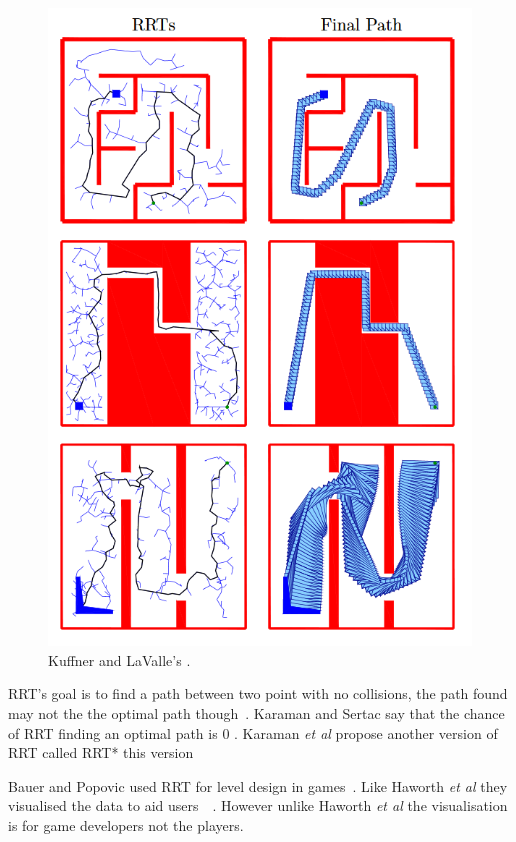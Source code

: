 \documentclass[journal]{IEEEtran}
\begin{document}
\begin{figure}[h]
	\includegraphics[width=1.0\linewidth]{KuffnerRRT.png}
	\caption{ Kuffner and LaValle's \cite{Kuffner2000}.}
	\label{KuffnerRRT}
\end{figure} 


RRT's goal is to find a path between two point with no collisions, the path found may not the the optimal path though~\cite{Kuffner2000, Karaman2011}.  Karaman and Sertac say that the chance of RRT finding an optimal path is 0 \cite{karaman2010}.  Karaman \textit{et al} propose another version of RRT called RRT* this version 

Bauer and Popovic used RRT for level design in games~\cite{bauer2012}. Like Haworth \textit{et al} they visualised the data to aid users~\cite{bauer2012}~\cite{Haworth2010}. However unlike Haworth \textit{et al} the visualisation is for game developers not the players. 
\end{document}
